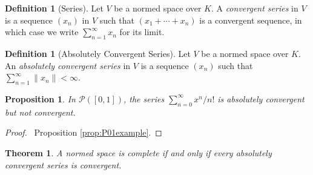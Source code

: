 \documentclass{book}
\let\qed\relax
\newtheorem{prop}[ax]{Proposition}
\newtheorem{thm}[ax]{Theorem}
\theoremstyle{definition}
\newtheorem{df}[ax]{Definition}
\begin{document}
\begin{df}[Series]
Let $V$ be a normed space over $K$.
A \emph{convergent series} in $V$ is a sequence $(x_n)$ in $V$ such that $(x_1 + \cdots + x_n)$ is a convergent sequence, in which case we write $\sum_{n=1}^\infty x_n$ for its limit.
\end{df}

\begin{df}[Absolutely Convergent Series]
Let $V$ be a normed space over $K$. An \emph{absolutely convergent series} in $V$ is a sequence $(x_n)$ such that $\sum_{n=1}^\infty \| x_n\| < \infty$.
\end{df}

\begin{prop}
In $\mathcal{P}([0,1])$, the series $\sum_{n=0}^\infty x^n/n!$ is absolutely convergent but not convergent.
\end{prop}

\begin{proof}
\pf\ Proposition \ref{prop:P01example}. \qed
\end{proof}

\begin{thm}
\label{thm:absconvconv}
A normed space is complete if and only if every absolutely convergent series is convergent.
\end{thm}
\end{document}
